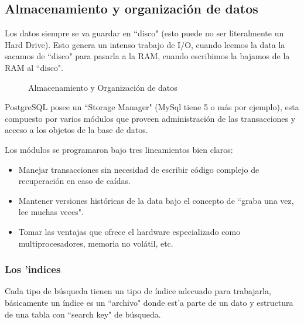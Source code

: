 \subsection{Almacenamiento y organizaci\'on de datos}
Los datos siempre se va guardar en ``disco" (esto puede no ser literalmente un Hard Drive).
Esto genera un intenso trabajo de I/O, cuando leemos la data la sacamos de ``disco" para pasarla a la RAM, cuando escribimos la bajamos de la RAM al ``disco".
\begin{figure}[H]
\centering
{}
\caption{Almacenamiento y Organizaci\'on de datos \cite{postgresqlpordentro}} \label{fig:almacenamientoorganizaciondatos}
\end{figure}
PostgreSQL posee un ``Storage Manager" (MySql tiene 5 o m\'as por ejemplo), esta compuesto por varios m\'odulos que proveen administraci\'on de las transacciones y acceso a los objetos de la base de datos.

Los m\'odulos se programaron bajo tres lineamientos bien claros:
\begin{itemize}
\item Manejar transacciones sin necesidad de escribir c\'odigo complejo de recuperaci\'on en caso de ca\'idas.
\item Mantener versiones hist\'oricas  de la data bajo el concepto de ``graba una vez, lee muchas veces".
\item Tomar las ventajas que ofrece el hardware especializado como multiprocesadores, memoria no vol\'atil, etc.  
\end{itemize}
\subsubsection{Los 'indices}
Cada tipo de b\'usqueda tienen un tipo de \'indice adecuado para trabajarla, b\'asicamente un \'indice es un ``archivo" donde est'a parte de un dato y estructura de una tabla con ``search key" de b\'usqueda.\\

